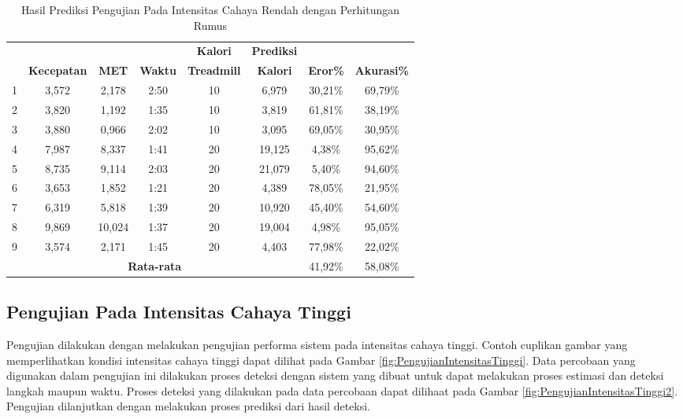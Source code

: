 \begin{longtable}{|c|c|c|c|c|c|c|c|}
  \caption{Hasil Prediksi Pengujian Pada Intensitas Cahaya Rendah dengan Perhitungan Rumus}
  \label{tb:PengujianIntensitasRendahAnalisaPrediksiPerhitungan}                                   \\
  \hline
  \rowcolor[HTML]{C0C0C0}
  & & & & \textbf{Kalori} & \textbf{Prediksi} & & \\
  \rowcolor[HTML]{C0C0C0}
  \multirow{-2}{*}{\textbf{Percobaan}} & \multirow{-2}{*}{\textbf{Kecepatan}} & \multirow{-2}{*}{\textbf{MET}} & \multirow{-2}{*}{\textbf{Waktu}} & \textbf{Treadmill} & \textbf{Kalori} & \multirow{-2}{*}{\textbf{Eror\%}} & \multirow{-2}{*}{\textbf{Akurasi\%}} \\
  \hline
  1   & 3,572   & 2,178    & 2:50    & 10   & 6,979    & 30,21\%     & 69,79\%   \\
  \hline
  2   & 3,820   & 1,192    & 1:35    & 10   & 3,819    & 61,81\%     & 38,19\%   \\
  \hline
  3   & 3,880   & 0,966    & 2:02    & 10   & 3,095    & 69,05\%     & 30,95\%   \\
  \hline
  4   & 7,987   & 8,337    & 1:41    & 20   & 19,125   & 4,38\%      & 95,62\%   \\
  \hline
  5   & 8,735   & 9,114    & 2:03    & 20   & 21,079   & 5,40\%      & 94,60\%   \\
  \hline
  6   & 3,653   & 1,852    & 1:21    & 20   & 4,389    & 78,05\%     & 21,95\%   \\
  \hline
  7   & 6,319   & 5,818    & 1:39    & 20   & 10,920   & 45,40\%     & 54,60\%   \\
  \hline
  8   & 9,869   & 10,024   & 1:37    & 20   & 19,004   & 4,98\%      & 95,05\%   \\
  \hline
  9   & 3,574   & 2,171    & 1:45    & 20   & 4,403    & 77,98\%     & 22,02\%   \\
  \hline

  \multicolumn{6}{|c|}{\textbf{Rata-rata}} & 41,92\% & 58,08\%  \\
  \hline
\end{longtable}


\subsection{Pengujian Pada Intensitas Cahaya Tinggi}
\label{subsec:PengujianIntensitasTinggi}

Pengujian dilakukan dengan melakukan pengujian performa sistem pada intensitas cahaya tinggi. Contoh cuplikan gambar yang memperlihatkan kondisi intensitas cahaya tinggi dapat dilihat pada Gambar \ref{fig:PengujianIntensitasTinggi}. Data percobaan yang digunakan dalam pengujian ini dilakukan proses deteksi dengan sistem yang dibuat untuk dapat melakukan proses estimasi dan deteksi langkah maupun waktu. Proses deteksi yang dilakukan pada data percobaan dapat dilihaat pada Gambar \ref{fig:PengujianIntensitasTinggi2}. Pengujian dilanjutkan dengan melakukan proses prediksi dari hasil deteksi.

